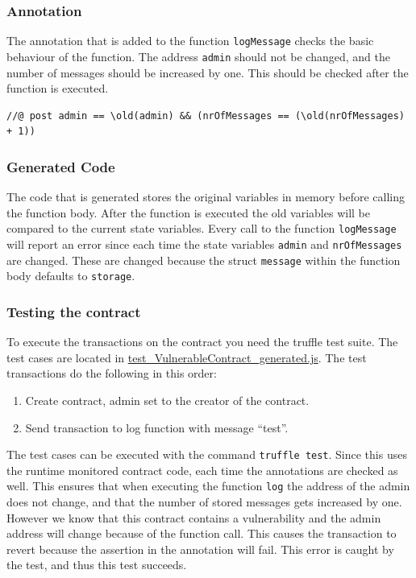 \documentclass[a4paper]{article}
\begin{document}
\subsubsection{Annotation}
The annotation that is added to the function \texttt{logMessage} checks the basic behaviour of the function. The address \texttt{admin} should not be changed, and the number of messages should be increased by one. This should be checked after the function is executed.
\begin{lstlisting}[basicstyle=\ttfamily, breaklines=true ]
//@ post admin == \old(admin) && (nrOfMessages == (\old(nrOfMessages) + 1))
\end{lstlisting}
\subsubsection{Generated Code}
The code that is generated stores the original variables in memory before calling the function body. After the function is executed the old variables will be compared to the current state variables. Every call to the function \texttt{logMessage} will report an error since each time the state variables \texttt{admin} and \texttt{nrOfMessages} are changed. These are changed because the struct \texttt{message} within the function body defaults to \texttt{storage}. 


\subsubsection{Testing the contract}
To execute the transactions on the contract you need the truffle test suite. The test cases are located in \href{https://github.com/LarsStegeman/EthereumRuntimeMonitoring/blob/master/src/test/test_VulnerableContract_generated.js}{test\_VulnerableContract\_generated.js}.
The test transactions do the following in this order:
\begin{enumerate}
  \item Create contract, admin set to the creator of the contract.
  \item Send transaction to log function with message ``test''.
\end{enumerate}
The test cases can be executed with the command \texttt{truffle test}. Since this uses the runtime monitored contract code, each time the annotations are checked as well. This ensures that when executing the function \texttt{log} the address of the admin does not change, and that the number of stored messages gets increased by one. However we know that this contract contains a vulnerability and the admin address will change because of the function call. This causes the transaction to revert because the assertion in the annotation will fail. This error is caught by the test, and thus this test succeeds.
\end{document}
